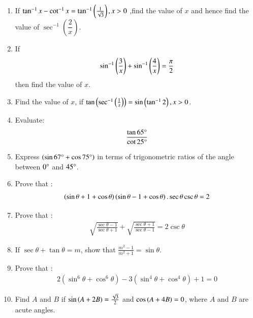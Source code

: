 \begin{enumerate}
\item If $\tan^{-1}x-\cot^{-1}x =\tan^{-1}\left(\frac{1}{ \sqrt3}\right), x>0$ ,find the value of $x$ and hence find the value of $\sec^{-1}\left(\dfrac{2}{x}\right)$.

\hfill{}\item  If
\begin{align*}
 \sin^{-1} \left(\dfrac{3}{x}\right) + \sin^{-1}\left(\dfrac{4}{x}\right)=\dfrac{\pi}{2} 
\end{align*}
then find the value of $x$. 

\hfill{}\item Find the value of $x$, if $\tan \left(\sec^{-1}\left(\frac{1}{x}\right)\right) = \sin \left(\tan^{-1}{2}\right),x > 0$.
\hfill{}

\item  Evaluate:
\begin{align*}
    \frac {\tan 65\degree}  {\cot 25\degree}
\end{align*}

\hfill{}\item Express $\left({\sin 67\degree}+ {\cos 75\degree}\right)$ in terms of trigonometric ratios of the angle between $0\degree$ and $45\degree$.

\hfill{}\item Prove that :
\begin{align*}
    \left(\sin \theta+1+\cos \theta\right) \left(\sin\theta-1+\cos\theta\right).\sec\theta \csc\theta=2
\end{align*}

\hfill{}\item Prove that :
\begin{align*}
      \sqrt{\frac{\sec\theta-1}{\sec\theta+1}} + \sqrt{\frac{\sec\theta+1}{\sec\theta-1}} = 2\csc\theta
\end{align*}

\hfill{}\item If $\sec\theta + \tan\theta=m$, show that $\frac{m^2-1}{m^2+1} = \sin\theta$.

\hfill{}\item Prove that :
\begin{align*}
    2 (\sin^6\theta +\cos^6\theta) - 3 (\sin^4\theta + \cos^4\theta) + 1 = 0
\end{align*}

\hfill{}\item Find $A$ and $B$ if $\sin \left(A + 2B\right)=\frac{\sqrt{3}}{2}$ and $\cos \left(A + 4B\right) = 0$, where $A$ and $B$ are acute angles.






\end{enumerate}
